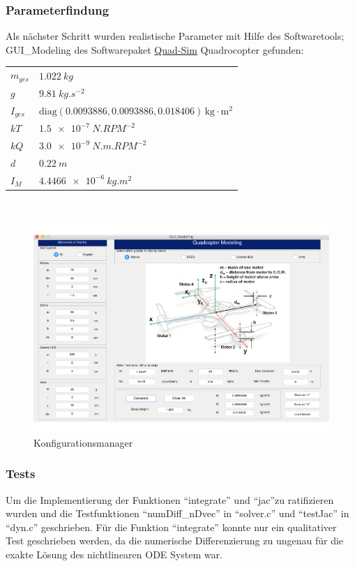 \subsubsection{Parameterfindung}
Als nächster Schritt wurden realistische Parameter mit Hilfe des Softwaretools; GUI\_Modeling des Softwarepaket \href{https://github.com/dch33/Quad-Sim}{Quad-Sim} Quadrocopter gefunden:\\
\begin{tabular}[t]{|l|l|}
  \hline
  $m_{ges}$ & $\SI{1.022}{kg}$  \\ 
  $g$     & $\SI{9.81}{kg.s^{-2}}$  \\
  $I_{ges}$ & $\mathrm{diag}(0.0093886, 0.0093886, 0.018406)\, \mathrm{kg} \cdot \mathrm{m}^2$\\
  $kT$ & $\SI{1.5e-7}{N.{RPM}^{-2}}$\\
  $kQ$ & $\SI{3.0e-9}{N.m.{RPM}^{-2}}$\\
  $d$ & $\SI{0.22}{m}$\\
  $I_M$ & $\SI{4.4466e-6}{kg.m^2}$\\
  \hline
\end{tabular}\\
\begin{figure}[ht]
  \centering
  \includegraphics[width=\linewidth]{images/KonfigurationsManager.pdf}
  \caption{Konfigurationsmanager}
  \label{fig:konfigurationsmanager}
\end{figure} 
\subsubsection{Tests}
Um die Implementierung der Funktionen ``integrate'' und ``jac''zu ratifizieren wurden und die Testfunktionen ``numDiff\_nDvec'' in ``solver.c'' und ``testJac'' in ``dyn.c'' geschrieben. Für die Funktion ``integrate'' konnte nur ein qualitativer Test geschrieben werden, da die numerische Differenzierung zu ungenau für die exakte Lösung des nichtlinearen ODE System war.
